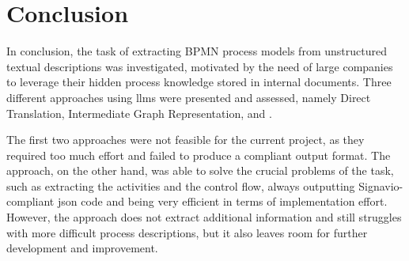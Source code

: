 \chapter{Conclusion}
In conclusion, the task of extracting BPMN process models from unstructured textual descriptions was investigated, motivated by the need of large companies to leverage their hidden process knowledge stored in internal documents. Three different approaches using \glspl{llm} were presented and assessed, namely Direct Translation, Intermediate Graph Representation, and .

The first two approaches were not feasible for the current  project, as they required too much effort and failed to produce a compliant output format. The   approach, on the other hand, was able to solve the crucial problems of the task, such as extracting the activities and the control flow, always outputting Signavio-compliant \acs{json} code and being very efficient in terms of implementation effort. However, the approach does not extract additional information and still struggles with more difficult process descriptions, but it also leaves room for further development and improvement.

\newpage
